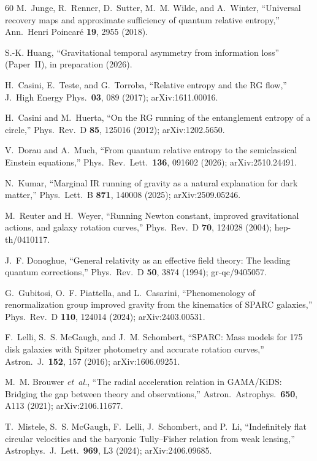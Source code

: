 \documentclass[prd,twocolumn,superscriptaddress,longbibliography,floatfix]{revtex4-2}
\begin{document}
\begin{thebibliography}{60}
M.~Junge, R.~Renner, D.~Sutter, M.~M. Wilde, and A.~Winter,
``Universal recovery maps and approximate sufficiency of
quantum relative entropy,''
Ann.\ Henri Poincar\'e \textbf{19}, 2955 (2018).

S.-K. Huang,
``Gravitational temporal asymmetry from information loss''
(Paper~II), in preparation (2026).

H.~Casini, E.~Teste, and G.~Torroba,
``Relative entropy and the RG flow,''
J.\ High Energy Phys.\ \textbf{03}, 089 (2017);
arXiv:1611.00016.

H.~Casini and M.~Huerta,
``On the RG running of the entanglement entropy of a circle,''
Phys.\ Rev.\ D \textbf{85}, 125016 (2012);
arXiv:1202.5650.

V.~Dorau and A.~Much,
``From quantum relative entropy to the semiclassical Einstein
equations,''
Phys.\ Rev.\ Lett.\ \textbf{136}, 091602 (2026);
arXiv:2510.24491.

N.~Kumar,
``Marginal IR running of gravity as a natural explanation
for dark matter,''
Phys.\ Lett.\ B \textbf{871}, 140008 (2025);
arXiv:2509.05246.

M.~Reuter and H.~Weyer,
``Running Newton constant, improved gravitational actions, and
galaxy rotation curves,''
Phys.\ Rev.\ D \textbf{70}, 124028 (2004);
hep-th/0410117.

J.~F. Donoghue,
``General relativity as an effective field theory: The leading
quantum corrections,''
Phys.\ Rev.\ D \textbf{50}, 3874 (1994);
gr-qc/9405057.

G.~Gubitosi, O.~F. Piattella, and L.~Casarini,
``Phenomenology of renormalization group improved gravity from
the kinematics of SPARC galaxies,''
Phys.\ Rev.\ D \textbf{110}, 124014 (2024);
arXiv:2403.00531.

F.~Lelli, S.~S. McGaugh, and J.~M. Schombert,
``SPARC: Mass models for 175 disk galaxies with Spitzer
photometry and accurate rotation curves,''
Astron.\ J.\ \textbf{152}, 157 (2016);
arXiv:1606.09251.

M.~M. Brouwer \emph{et~al.},
``The radial acceleration relation in GAMA/KiDS:
Bridging the gap between theory and observations,''
Astron.\ Astrophys.\ \textbf{650}, A113 (2021);
arXiv:2106.11677.

T.~Mistele, S.~S. McGaugh, F.~Lelli, J.~Schombert, and P.~Li,
``Indefinitely flat circular velocities and the baryonic
Tully--Fisher relation from weak lensing,''
Astrophys.\ J.\ Lett.\ \textbf{969}, L3 (2024);
arXiv:2406.09685.


\end{thebibliography}
\end{document}

